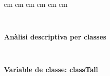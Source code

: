 \pagestyle{plain}
 cm
 cm
 cm
 cm
 cm
 cm

\setlength{\baselineskip}{1.5em}
\setlength{\parskip}{0em}
\setlength{\parsep}{0.5em}
\newcommand{\lge}[1]{\hbox{#1\kern-.1em\raise.5ex\hbox{.}\kern-.1em #1}}
\mbox{ } \vfill
\begin{center} \Large \bf An\`alisi descriptiva per classes \end{center}

\newpage
\vspace{3ex}
\mbox{ } \vfill
\begin{center} \Large \bf Variable de classe: classTall \end{center}

